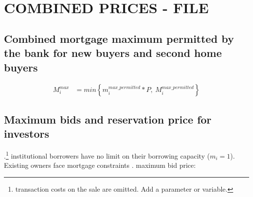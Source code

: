 {%






 



\section{COMBINED PRICES - FILE}
\subsection{Combined mortgage maximum permitted by the bank for new buyers and second home buyers}

\begin{align} 
M_i^{max} &= min \left\{ m_i^{max\_permitted}*P, \ M^{max\_permitted}_i \right\} 
\nonumber
\end{align}


\subsection{Maximum bids and reservation price for investors}.\footnote{transaction costs on the sale are omitted. Add a parameter or variable.}
institutional borrowers have no limit on their borrowing capacity ($m_i=1$). Existing owners face mortgage constraints .
maximum bid price:

}
